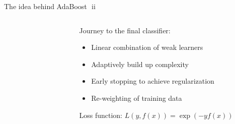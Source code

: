 \begin{frame}{The idea behind AdaBoost \,\,ii}
\begin{columns}[T]
\begin{column}{0.48\textwidth}
\begin{figure}
\end{figure}
\end{column}
\begin{column}{0.48\textwidth}
\vspace{0.7em}
Journey to the final classifier:
{\small\begin{itemize}
	\setlength{\itemsep}{-0.8ex}
	\item Linear combination of \alert{weak learners}
	\item Adaptively build up complexity
	\item Early stopping to achieve regularization
	\item \alert{Re-weighting} of training data  %
\end{itemize}}
\vspace{1em}
Loss function:
$L(y,f(x))=\exp(-yf(x))$
\end{column}
\end{columns}

\end{frame}


